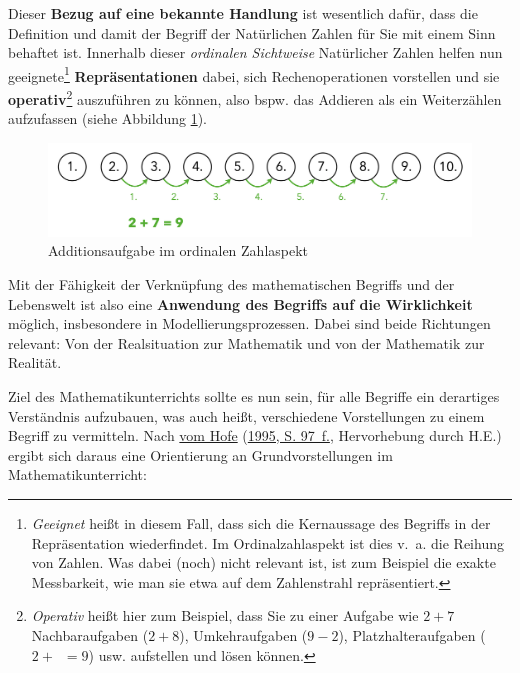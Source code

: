 \documentclass[
  ngerman,
]{scrbook}
\theoremstyle{definition}
\theoremstyle{definition}
\theoremstyle{definition}
\theoremstyle{definition}
\theoremstyle{remark}
\begin{document}
Dieser \textbf{Bezug auf eine bekannte Handlung} ist wesentlich dafür, dass die Definition und damit der Begriff der Natürlichen Zahlen für Sie mit einem Sinn behaftet ist. Innerhalb dieser \emph{ordinalen Sichtweise} Natürlicher Zahlen helfen nun geeignete\footnote{\emph{Geeignet} heißt in diesem Fall, dass sich die Kernaussage des Begriffs in der Repräsentation wiederfindet. Im Ordinalzahlaspekt ist dies v.~a. die Reihung von Zahlen. Was dabei (noch) nicht relevant ist, ist zum Beispiel die exakte Messbarkeit, wie man sie etwa auf dem Zahlenstrahl repräsentiert.} \textbf{Repräsentationen} dabei, sich Rechenoperationen vorstellen und sie \textbf{operativ}\footnote{\emph{Operativ} heißt hier zum Beispiel, dass Sie zu einer Aufgabe wie \(2+7\) Nachbaraufgaben (\(2+8\)), Umkehraufgaben (\(9-2\)), Platzhalteraufgaben (\(2+\boxed{\phantom{7}}=9\)) usw. aufstellen und lösen können.} auszuführen zu können, also bspw. das Addieren als ein Weiterzählen aufzufassen (siehe Abbildung \ref{fig:Addition}).

\begin{figure}

{\centering \includegraphics[width=0.75\linewidth]{pictures/4-Addition} 

}

\caption{Additionsaufgabe im ordinalen Zahlaspekt}\label{fig:Addition}
\end{figure}

Mit der Fähigkeit der Verknüpfung des mathematischen Begriffs und der Lebenswelt ist also eine \textbf{Anwendung des Begriffs auf die Wirklichkeit} möglich, insbesondere in Modellierungsprozessen. Dabei sind beide Richtungen relevant: Von der Realsituation zur Mathematik und von der Mathematik zur Realität.

Ziel des Mathematikunterrichts sollte es nun sein, für alle Begriffe ein derartiges Verständnis aufzubauen, was auch heißt, verschiedene Vorstellungen zu einem Begriff zu vermitteln. Nach \protect\hyperlink{ref-Hofe:1995}{vom Hofe} (\protect\hyperlink{ref-Hofe:1995}{1995, S. 97~f.}, Hervorhebung durch H.E.) ergibt sich daraus eine Orientierung an Grundvorstellungen im Mathematikunterricht:
\end{document}
